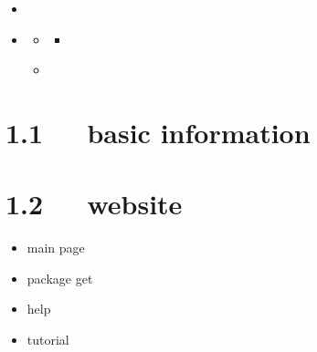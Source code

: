 \documentclass[letterpaper,12pt,english]{sphinxmanual}
\begin{document}
\begin{sphinxShadowBox}
\begin{itemize}
\begin{itemize}
\begin{itemize}
\end{itemize}

\item {} 
\label{\detokenize{001software/001install/sublime:id72}}{\hyperref[\detokenize{001software/001install/sublime:latex}]{}}

\item {} 
\label{\detokenize{001software/001install/sublime:id73}}{\hyperref[\detokenize{001software/001install/sublime:sublime-tips}]{}}
\begin{itemize}
\item {} 
\label{\detokenize{001software/001install/sublime:id74}}{\hyperref[\detokenize{001software/001install/sublime:id10}]{}}
\begin{itemize}
\item {} 
\label{\detokenize{001software/001install/sublime:id75}}{\hyperref[\detokenize{001software/001install/sublime:project}]{}}

\end{itemize}

\item {} 
\label{\detokenize{001software/001install/sublime:id76}}{\hyperref[\detokenize{001software/001install/sublime:sublime-insert-nums}]{}}

\end{itemize}

\end{itemize}

\end{itemize}
\end{sphinxShadowBox}


\section{1.1   basic information}
\label{\detokenize{001software/001install/sublime:basic-information}}

\section{1.2   website}
\label{\detokenize{001software/001install/sublime:website}}\begin{itemize}
\item {} 
main page

\item {} 
package get

\item {} 
help

\item {} 
tutorial

\end{itemize}
\end{document}

